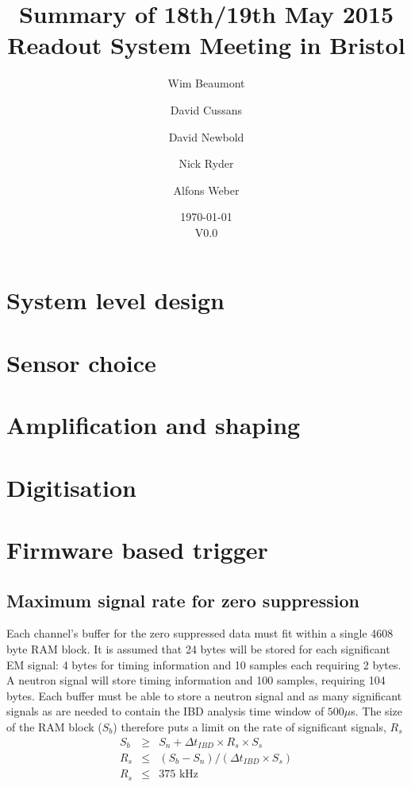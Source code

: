 \documentclass[a4paper]{article}
\title{Summary of 18th/19th May 2015 Readout System Meeting in Bristol}
\author[1]{Wim Beaumont}
\author[2]{David Cussans}
\author[2]{David Newbold}
\author[3]{Nick Ryder}
\author[3]{Alfons Weber}
\affil[1]{Universiteit Antwerpen}
\affil[2]{University of Bristol}
\affil[3]{University of Oxford}
\date{\today\\V0.0}
\begin{document}
\maketitle


\tableofcontents

\section{System level design}

\section{Sensor choice}

\section{Amplification and shaping}

\section{Digitisation}

\section{Firmware based trigger}

\subsection{Maximum signal rate for zero suppression}

Each channel's buffer for the zero suppressed data must fit within a single 4608 byte RAM block.
It is assumed that 24 bytes will be stored for each significant EM signal: 4 bytes for timing information and 10 samples each requiring 2 bytes.
A neutron signal will store timing information and 100 samples, requiring 104 bytes.
Each buffer must be able to store a neutron signal and as many significant signals as are needed to contain the IBD analysis time window of $500 \mu$s.
The size of the RAM block ($S_b$) therefore puts a limit on the rate of significant signals, $R_s$
\begin{eqnarray}
    S_b &\ge& S_n + \Delta t_{IBD}\times R_s \times S_s \\
    R_s &\le& (S_b - S_n) / (\Delta t_{IBD} \times S_s)\\
    R_s &\le& 375\mbox{ kHz}
\end{eqnarray}
\end{document}
